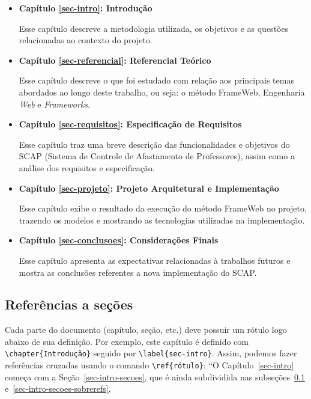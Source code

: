 \begin{itemize}

\item \textbf{Capítulo \ref{sec-intro}: Introdução}

Esse capítulo descreve a metodologia utilizada, os objetivos e as questões relacionadas ao contexto do projeto. 

\item \textbf{Capítulo \ref{sec-referencial}: Referencial Teórico}

Esse capítulo descreve o que foi estudado com relação aos principais temas abordados ao longo deste trabalho, ou seja: o método FrameWeb, Engenharia \textit{Web} e \textit{Frameworks}.

\item \textbf{Capítulo \ref{sec-requisitos}: Especificação de Requisitos}

Esse capítulo traz uma breve descrição das funcionalidades e objetivos do SCAP (Sistema de Controle de Afastamento de Professores), assim como a análise dos requisitos e especificação.

\item \textbf{Capítulo \ref{sec-projeto}: Projeto Arquitetural e Implementação}

Esse capítulo exibe o resultado da execução do método FrameWeb no projeto, trazendo os modelos e mostrando as tecnologias utilizadas na implementação. 

\item \textbf{Capítulo \ref{sec-conclusoes}: Considerações Finais}

Esse capítulo apresenta as expectativas relacionadas à trabalhos futuros e mostra as conclusões referentes a nova implementação do SCAP.  

\end{itemize}


\subsection{Referências a seções}
\label{sec-intro-secoes-refs}

Cada parte do documento (capítulo, seção, etc.) deve possuir um rótulo logo abaixo de sua definição. Por exemplo, este capítulo é definido com \texttt{\textbackslash chapter\{Introdução\}} seguido por \texttt{\textbackslash label\{sec-intro\}}. Assim, podemos fazer referências cruzadas usando o comando \texttt{\textbackslash ref\{rótulo\}}: ``O Capítulo~\ref{sec-intro} começa com a Seção~\ref{sec-intro-secoes}, que é ainda subdividida nas subseções~\ref{sec-intro-secoes-refs} e~\ref{sec-intro-secoes-sobrerefs}.

